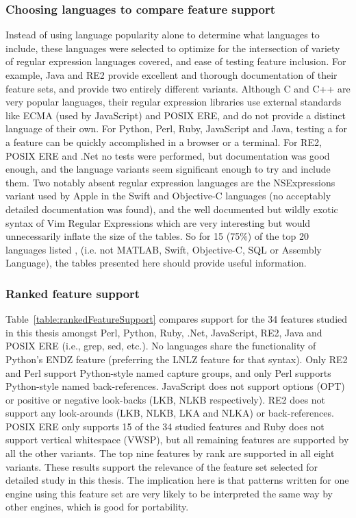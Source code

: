 \subsubsection{Choosing languages to compare feature support}
\label{sec:languagesChosen}
Instead of using language popularity alone to determine what languages to include, these languages were selected to optimize for the intersection of variety of regular expression languages covered, and ease of testing feature inclusion.  For example, Java and RE2 provide excellent and thorough documentation of their feature sets, and provide two entirely different variants.  Although C and C++ are very popular languages, their regular expression libraries use external standards like ECMA (used by JavaScript) and POSIX ERE, and do not provide a distinct language of their own.  For Python, Perl, Ruby, JavaScript and Java, testing a for a feature can be quickly accomplished in a browser or a terminal.  For RE2, POSIX ERE and .Net no tests were performed, but documentation was good enough, and the language variants seem significant enough to try and include them.  Two notably absent regular expression languages are the NSExpressions variant used by Apple in the Swift and Objective-C languages (no acceptably detailed documentation was found), and the well documented but wildly exotic syntax of Vim Regular Expressions which are very interesting but would unnecessarily inflate the size of the tables. So for 15 (75\%) of the top 20 languages listed , (i.e. not MATLAB, Swift, Objective-C, SQL or Assembly Language), the tables presented here should provide useful information.




\subsubsection{Ranked feature support}
Table~\ref{table:rankedFeatureSupport} compares support for the 34 features studied in this thesis amongst Perl, Python, Ruby, .Net, JavaScript, RE2, Java and POSIX ERE (i.e., grep, sed, etc.).  No languages share the functionality of Python's ENDZ feature (preferring the LNLZ feature for that syntax).  Only RE2 and Perl support Python-style named capture groups, and only Perl supports Python-style named back-references.  JavaScript does not support options (OPT) or positive or negative look-backs (LKB, NLKB respectively).  RE2 does not support any look-arounds (LKB, NLKB, LKA and NLKA) or back-references.  POSIX ERE only supports 15 of the 34 studied features and Ruby does not support vertical whitespace (VWSP), but all remaining features are supported by all the other variants.  The top nine features by rank are supported in all eight variants.  These results support the relevance of the feature set selected for detailed study in this thesis.  The implication here is that patterns written for one engine using this feature set are very likely to be interpreted the same way by other engines, which is good for portability.

